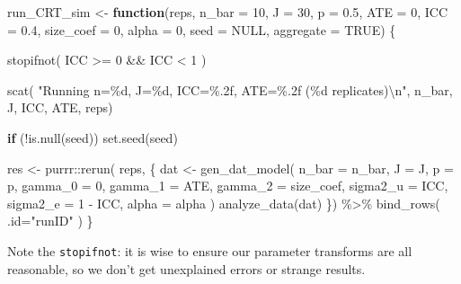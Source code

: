 \documentclass[
]{book}
\newenvironment{Shaded}{\begin{snugshade}}{\end{snugshade}}
\newcommand{\AttributeTok}[1]{\textcolor[rgb]{0.77,0.63,0.00}{#1}}
\newcommand{\ConstantTok}[1]{\textcolor[rgb]{0.00,0.00,0.00}{#1}}
\newcommand{\ControlFlowTok}[1]{\textcolor[rgb]{0.13,0.29,0.53}{\textbf{#1}}}
\newcommand{\DecValTok}[1]{\textcolor[rgb]{0.00,0.00,0.81}{#1}}
\newcommand{\FloatTok}[1]{\textcolor[rgb]{0.00,0.00,0.81}{#1}}
\newcommand{\FunctionTok}[1]{\textcolor[rgb]{0.00,0.00,0.00}{#1}}
\newcommand{\NormalTok}[1]{#1}
\newcommand{\OtherTok}[1]{\textcolor[rgb]{0.56,0.35,0.01}{#1}}
\newcommand{\SpecialCharTok}[1]{\textcolor[rgb]{0.00,0.00,0.00}{#1}}
\newcommand{\StringTok}[1]{\textcolor[rgb]{0.31,0.60,0.02}{#1}}
\begin{document}
\begin{Shaded}
\begin{Highlighting}[]
\NormalTok{run\_CRT\_sim }\OtherTok{\textless{}{-}} \ControlFlowTok{function}\NormalTok{(reps, }
                        \AttributeTok{n\_bar =} \DecValTok{10}\NormalTok{, }\AttributeTok{J =} \DecValTok{30}\NormalTok{, }\AttributeTok{p =} \FloatTok{0.5}\NormalTok{,}
                        \AttributeTok{ATE =} \DecValTok{0}\NormalTok{, }\AttributeTok{ICC =} \FloatTok{0.4}\NormalTok{,}
                        \AttributeTok{size\_coef =} \DecValTok{0}\NormalTok{, }\AttributeTok{alpha =} \DecValTok{0}\NormalTok{,}
                        \AttributeTok{seed =} \ConstantTok{NULL}\NormalTok{, }\AttributeTok{aggregate =} \ConstantTok{TRUE}\NormalTok{) \{}

  \FunctionTok{stopifnot}\NormalTok{( ICC }\SpecialCharTok{\textgreater{}=} \DecValTok{0} \SpecialCharTok{\&\&}\NormalTok{ ICC }\SpecialCharTok{\textless{}} \DecValTok{1}\NormalTok{ )}
  
  \FunctionTok{scat}\NormalTok{( }\StringTok{"Running n=\%d, J=\%d, ICC=\%.2f, ATE=\%.2f (\%d replicates)}\SpecialCharTok{\textbackslash{}n}\StringTok{"}\NormalTok{, n\_bar, J, ICC, ATE, reps)}

  \ControlFlowTok{if}\NormalTok{ (}\SpecialCharTok{!}\FunctionTok{is.null}\NormalTok{(seed)) }\FunctionTok{set.seed}\NormalTok{(seed)}

\NormalTok{  res }\OtherTok{\textless{}{-}} 
\NormalTok{    purrr}\SpecialCharTok{::}\FunctionTok{rerun}\NormalTok{( reps, \{}
\NormalTok{      dat }\OtherTok{\textless{}{-}} \FunctionTok{gen\_dat\_model}\NormalTok{( }\AttributeTok{n\_bar =}\NormalTok{ n\_bar, }\AttributeTok{J =}\NormalTok{ J, }\AttributeTok{p =}\NormalTok{ p,}
                            \AttributeTok{gamma\_0 =} \DecValTok{0}\NormalTok{, }\AttributeTok{gamma\_1 =}\NormalTok{ ATE, }\AttributeTok{gamma\_2 =}\NormalTok{ size\_coef,}
                            \AttributeTok{sigma2\_u =}\NormalTok{ ICC, }\AttributeTok{sigma2\_e =} \DecValTok{1} \SpecialCharTok{{-}}\NormalTok{ ICC,}
                            \AttributeTok{alpha =}\NormalTok{ alpha )}
      \FunctionTok{analyze\_data}\NormalTok{(dat)}
\NormalTok{    \}) }\SpecialCharTok{\%\textgreater{}\%}
    \FunctionTok{bind\_rows}\NormalTok{( }\AttributeTok{.id=}\StringTok{"runID"}\NormalTok{ )}
\NormalTok{\}}
\end{Highlighting}
\end{Shaded}

Note the \texttt{stopifnot}: it is wise to ensure our parameter transforms are all reasonable, so we don't get unexplained errors or strange results.
\end{document}
